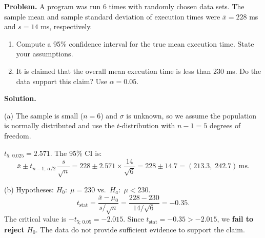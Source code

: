 \documentclass[10pt]{report}
\begin{document}
\begin{hwbox}
\textbf{Problem.} A program was run 6 times with randomly chosen data sets. The sample mean and sample standard deviation of execution times were $\bar{x} = 228$ ms and $s = 14$ ms, respectively.

\begin{enumerate}[label=(\alph*)]
  \item Compute a 95\% confidence interval for the true mean execution time. State your assumptions.
  \item It is claimed that the overall mean execution time is less than 230 ms. Do the data support this claim? Use $\alpha = 0.05$.
\end{enumerate}

\textbf{Solution.}

(a) The sample is small ($n = 6$) and $\sigma$ is unknown, so we assume the population is normally distributed and use the $t$-distribution with $n-1 = 5$ degrees of freedom.

$t_{5;\, 0.025} = 2.571$. The 95\% CI is:
\[
\bar{x} \pm t_{n-1;\, \alpha/2}\,\frac{s}{\sqrt{n}} = 228 \pm 2.571 \times \frac{14}{\sqrt{6}} = 228 \pm 14.7 = (213.3,\; 242.7)\,\text{ms.}
\]

(b) Hypotheses: $H_0{:}\; \mu = 230$ vs.\ $H_a{:}\; \mu < 230$.
\[
t_{\text{stat}} = \frac{\bar{x} - \mu_0}{s/\sqrt{n}} = \frac{228 - 230}{14/\sqrt{6}} = -0.35.
\]
The critical value is $-t_{5;\, 0.05} = -2.015$. Since $t_{\text{stat}} = -0.35 > -2.015$, we \textbf{fail to reject} $H_0$. The data do not provide sufficient evidence to support the claim.
\end{hwbox}
\end{document}
